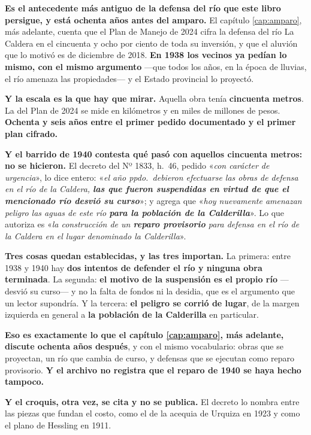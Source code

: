 \begin{cautela}
\textbf{Es el antecedente más antiguo de la defensa del río que este libro
persigue, y está ochenta años antes del amparo.} El capítulo
\ref{cap:amparo}, más adelante, cuenta que el Plan de Manejo de 2024 cifra la defensa del río
La Caldera en el cincuenta y ocho por ciento de toda su inversión, y que el
aluvión que lo motivó es de diciembre de 2018. \textbf{En 1938 los vecinos ya
pedían lo mismo, con el mismo argumento} ---que todos los años, en la época de
lluvias, el río amenaza las propiedades--- y el Estado provincial lo proyectó.

\textbf{Y la escala es la que hay que mirar.} Aquella obra tenía
\textbf{cincuenta metros}. La del Plan de 2024 se mide en kilómetros y en miles
de millones de pesos. \textbf{Ochenta y seis años entre el primer pedido
documentado y el primer plan cifrado.}

\textbf{Y el barrido de 1940 contesta qué pasó con aquellos cincuenta metros: no
se hicieron.} El decreto del Nº 1833, h.\ 46, pedido «\textit{con carácter de
urgencia}», lo dice entero: «\textit{el año ppdo.\ debieron efectuarse las obras
de defensa en el río de la Caldera, \textbf{las que fueron suspendidas en virtud
de que el mencionado río desvió su curso}}»; y agrega que «\textit{hoy
nuevamente amenazan peligro las aguas de este río \textbf{para la población de la
Calderilla}}». Lo que autoriza es «\textit{la construcción de un \textbf{reparo
provisorio} para defensa en el río de la Caldera en el lugar denominado la
Calderilla}».

\textbf{Tres cosas quedan establecidas, y las tres importan.} La primera: entre
1938 y 1940 hay \textbf{dos intentos de defender el río y ninguna obra
terminada}. La segunda: \textbf{el motivo de la suspensión es el propio río}
---desvió su curso--- y no la falta de fondos ni la desidia, que es el
argumento que un lector supondría. Y la tercera: \textbf{el peligro se corrió de
lugar}, de la margen izquierda en general a \textbf{la población de la
Calderilla} en particular.

\textbf{Eso es exactamente lo que el capítulo \ref{cap:amparo}, más adelante, discute ochenta
años después}, y con el mismo vocabulario: obras que se proyectan, un río que
cambia de curso, y defensas que se ejecutan como reparo provisorio. \textbf{Y el
archivo no registra que el reparo de 1940 se haya hecho tampoco.}

\textbf{Y el croquis, otra vez, se cita y no se publica.} El decreto lo nombra
entre las piezas que fundan el costo, como el de la acequia de Urquiza en 1923 y
como el plano de Hessling en 1911.
\end{cautela}

